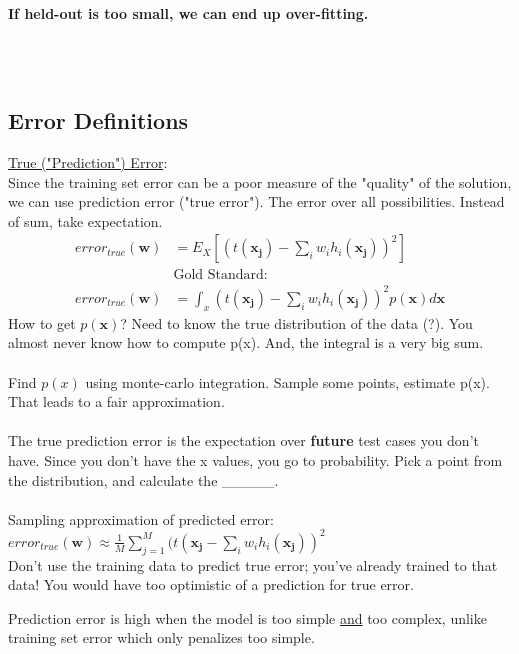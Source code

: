 \textbf{If held-out is too small, we can end up over-fitting.}


\hfill \\  \hfill \\

\subsection{Error Definitions}

\underline{True ("Prediction") Error}:   \hfill \\
Since the training set error can be a poor measure of the "quality" of the solution, we can use prediction error ("true error").  
The error over all possibilities.   Instead of sum, take expectation. 
\begin{align*}
	error_{true}(\bm{w}) &= E_X[(t(\bm{x_j})-\sum_{i} w_i h_i(\bm{x_j}))^2] \\
		& \mbox{Gold Standard:} \\
	error_{true}(\bm{w}) &= \int_x (t(\bm{x_j})-\sum_{i} w_i h_i(\bm{x_j}))^2 p(\bm{x}) d\bm{x}
\end{align*}
How to get $p(\bm{x})$?  Need to know the true distribution of the data (?).  
You almost never know how to compute p(x).
And, the integral is a very big sum. \hfill \\  \hfill \\

Find $p(x)$ using monte-carlo integration. 
Sample some points, estimate p(x).  
That leads to a fair approximation.  \hfill \\  \hfill \\

The true prediction error is the expectation over \textbf{future} test cases you don't have.  
Since you don't have the x values, you go to probability. 
Pick a point from the distribution, and calculate the \_\_\_\_\_.     \hfill \\  \hfill \\

Sampling approximation of predicted error: \hfill \\
$\displaystyle error_{true}(\bm{w}) \approx \frac{1}{M} \sum_{j=1}^M(t(\bm{x_j} - \sum_i w_i h_i(\bm{x_j}))^2$  \hfill \\
Don't use the training data to predict true error; you've already trained to that data!  You would have too optimistic of a prediction for true error. 

Prediction error is high when the model is too simple \underline{and} too complex, unlike training set error which only penalizes too simple.  \hfill \\
\hfill \\

